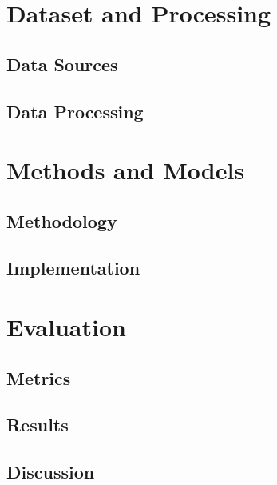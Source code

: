 \documentclass[12pt,a4paper]{article}
\begin{document}
  \section{Dataset and Processing}
  \subsection{Data Sources}

  \subsection{Data Processing}


  \section{Methods and Models}

  \subsection{Methodology}
  \subsection{Implementation}

  \section{Evaluation}
  \subsection{Metrics}

  \subsection{Results}

  \subsection{Discussion}
\end{document}
